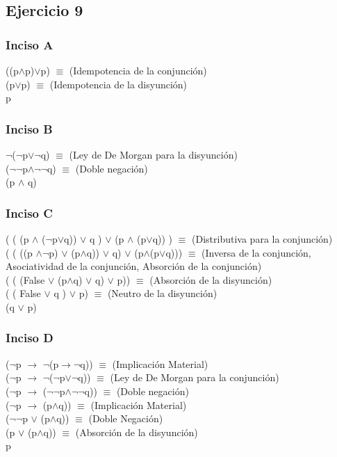 	\subsection{Ejercicio 9}
	
		\subsubsection{Inciso A}
		((p$\wedge$p)$\vee$p) $\equiv$ (Idempotencia de la conjunción)\\
		(p$\vee$p) $\equiv$ (Idempotencia de la disyunción)\\
		 p
		 
		 \subsubsection{Inciso B}
		 $\neg$($\neg$p$\vee$$\neg$q) $\equiv$ (Ley de De Morgan para la disyunción)\\
		 ($\neg$$\neg$p$\wedge$$\neg$$\neg$q) $\equiv$ (Doble negación)\\
		 (p $\wedge$ q)
	
		\subsubsection{Inciso C}
		( ( (p $\wedge$ ($\neg$p$\vee$q)) $\vee$ q ) $\vee$ (p $\wedge$ (p$\vee$q)) ) $\equiv$ (Distributiva para la conjunción)\\
		( ( ((p $\wedge$$\neg$p) $\vee$ (p$\wedge$q)) $\vee$ q) $\vee$ (p$\wedge$(p$\vee$q))) $\equiv$ (Inversa de la conjunción, Asociatividad de la conjunción, Absorción de la conjunción)\\
		( ( (False $\vee$ (p$\wedge$q) $\vee$ q) $\vee$ p)) $\equiv$ (Absorción de la disyunción)\\
		( ( False $\vee$ q ) $\vee$ p) $\equiv$ (Neutro de la disyunción)\\
		(q $\vee$ p)
		
		\subsubsection{Inciso D}
		($\neg$p $\rightarrow$ $\neg$(p$\rightarrow$$\neg$q)) $\equiv$ (Implicación Material)\\
		($\neg$p $\rightarrow$ $\neg$($\neg$p$\vee$$\neg$q)) $\equiv$ (Ley de De Morgan para la conjunción)\\
		($\neg$p $\rightarrow$ ($\neg$$\neg$p$\wedge$$\neg$$\neg$q)) $\equiv$ (Doble negación)\\
		($\neg$p $\rightarrow$ (p$\wedge$q)) $\equiv$ (Implicación Material)\\
		($\neg$$\neg$p $\vee$ (p$\wedge$q)) $\equiv$ (Doble Negación)\\
		(p $\vee$ (p$\wedge$q)) $\equiv$ (Absorción de la disyunción)\\
		p
		

